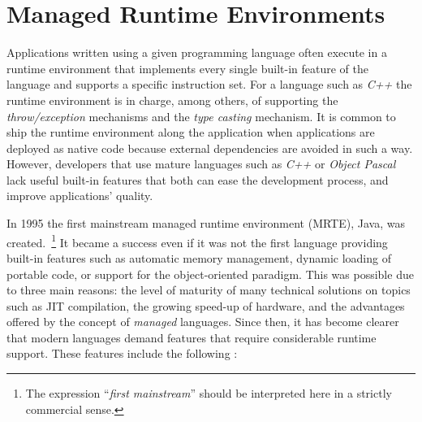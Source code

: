 \section{Managed Runtime Environments} \label{sec:mrtes}

Applications written using a given programming language often execute in a runtime environment that implements every single built-in feature of the language and supports a specific instruction set.
For a language such as \textit{C++} the runtime environment is in charge, among others, of supporting the \textit{throw/exception} mechanisms and the \textit{type casting} mechanism.
It is common to ship the runtime environment along the application when applications are deployed as native code because external dependencies are avoided in such a way.
However, developers that use mature languages such as \textit{C++} or \textit{Object Pascal} lack useful built-in features that both can ease the development process, and improve applications' quality.

In 1995 the first mainstream managed runtime environment (MRTE), Java, was created.~\footnote{The expression ``\textit{first mainstream}'' should be interpreted here in a strictly commercial sense.}
It became a success even if it was not the first language providing built-in features such as automatic memory management, dynamic loading of portable code, or support for the object-oriented paradigm.
This was possible due to three main reasons: the level of maturity of many technical solutions on topics such as \gls{JIT} compilation, the growing speed-up of hardware, and the advantages offered by the concept of \textit{managed} languages.
Since then, it has become clearer that modern languages demand features that require considerable runtime support.
These features include the following \cite{Cierniak2005}:

%

